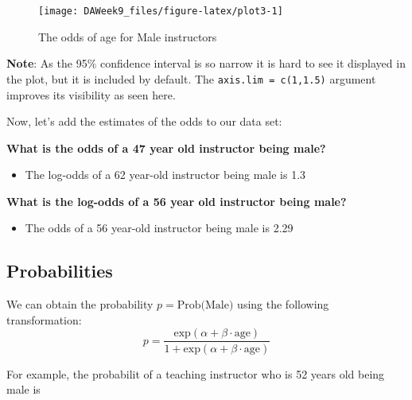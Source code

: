 \documentclass[]{article}
\newenvironment{Shaded}{\begin{snugshade}}{\end{snugshade}}
\newcommand{\KeywordTok}[1]{\textcolor[rgb]{0.13,0.29,0.53}{\textbf{#1}}}
\newcommand{\DataTypeTok}[1]{\textcolor[rgb]{0.13,0.29,0.53}{#1}}
\newcommand{\StringTok}[1]{\textcolor[rgb]{0.31,0.60,0.02}{#1}}
\newcommand{\OperatorTok}[1]{\textcolor[rgb]{0.81,0.36,0.00}{\textbf{#1}}}
\newcommand{\NormalTok}[1]{#1}
\providecommand{\tightlist}{%
  \setlength{\itemsep}{0pt}\setlength{\parskip}{0pt}}
\begin{document}
\begin{figure}

{\centering \texttt{[image: DAWeek9\_files/figure-latex/plot3-1]} 

}

\caption{\label{fig.plot3}The odds of age for Male instructors}\label{fig:plot3}
\end{figure}

\textbf{Note}: As the 95\% confidence interval is so narrow it is hard
to see it displayed in the plot, but it is included by default. The
\texttt{axis.lim\ =\ c(1,1.5)} argument improves its visibility as seen
here.

Now, let's add the estimates of the odds to our data set:

\begin{Shaded}
\end{Shaded}

\textbf{What is the odds of a 47 year old instructor being male?}

\begin{itemize}
\tightlist
\item
  The log-odds of a 62 year-old instructor being male is 1.3
\end{itemize}

\textbf{What is the log-odds of a 56 year old instructor being male?}

\begin{itemize}
\tightlist
\item
  The odds of a 56 year-old instructor being male is 2.29
\end{itemize}

\subsection{Probabilities}\label{probabilities}

We can obtain the probability \(p=\mbox{Prob(Male)}\) using the
following transformation:
\[p = \frac{\mbox{exp}(\alpha + \beta \cdot \mbox{age})}{1 + \mbox{exp}(\alpha + \beta \cdot \mbox{age})}\]

For example, the probabilit of a teaching instructor who is 52 years old
being male is
\end{document}
